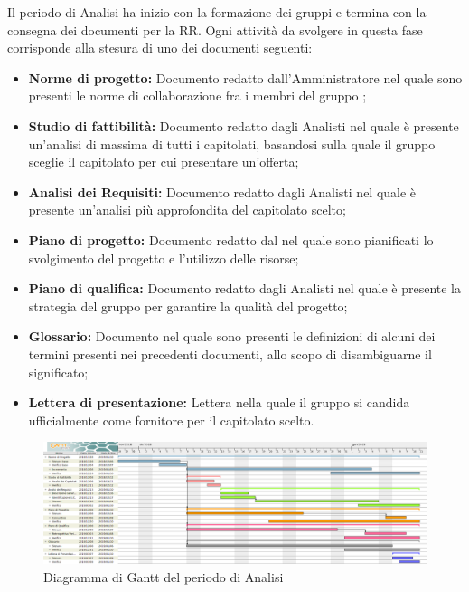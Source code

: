 Il periodo di Analisi ha inizio con la formazione dei gruppi e termina con la consegna dei documenti per la RR. \newline
Ogni attività da svolgere in questa fase corrisponde alla stesura di uno dei documenti seguenti: 
\begin{itemize}
	\item \textbf{Norme di progetto: }
	Documento redatto dall'Amministratore nel quale sono presenti le norme di collaborazione fra i membri del gruppo \gruppo ;
	\item \textbf{Studio di fattibilità: }
	Documento redatto dagli Analisti nel quale è presente un'analisi di massima di tutti 	i capitolati, basandosi sulla quale il gruppo sceglie il capitolato per cui presentare un'offerta;
	\item \textbf{Analisi dei Requisiti: }
	Documento redatto dagli Analisti nel quale è presente un'analisi più approfondita del capitolato scelto;
	\item \textbf{Piano di progetto: }
	Documento redatto dal \Res \space nel quale sono pianificati lo svolgimento del progetto e l'utilizzo delle risorse;
	\item \textbf{Piano di qualifica: }
	Documento redatto dagli Analisti nel quale è presente la strategia del gruppo \gruppo \space per garantire la qualità del progetto;
	\item \textbf{Glossario: }
	Documento nel quale sono presenti le definizioni di alcuni dei termini presenti nei precedenti documenti, allo scopo di disambiguarne il significato;
	\item \textbf{Lettera di presentazione: }
	Lettera nella quale il gruppo \gruppo \space si candida ufficialmente come fornitore per il capitolato scelto.
\end{itemize}

\begin{figure}[H]
	\includegraphics[width=1\linewidth]{Pianificazione/Analisi_Gantt.png}
	\caption{Diagramma di Gantt del periodo di Analisi}
\end{figure}
